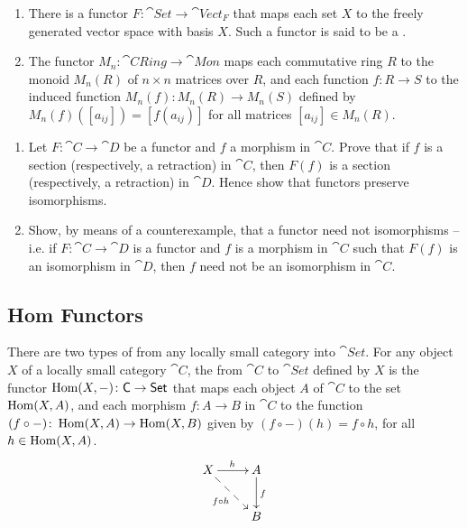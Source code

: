 \begin{Example}
\begin{enumerate}
\item There is a functor $F \colon \cat{Set} \to \cat{Vect}_F$ that maps each set $X$ to the freely generated vector space with basis $X$. Such a functor is said to be a .

\item The functor $M_n \colon \cat{CRing} \to \cat{Mon}$ maps each commutative ring $R$ to the monoid $M_n(R)$ of $n \times n$ matrices over $R$, and each function $f \colon R \to S$ to the induced function $M_n(f) \colon M_n(R) \to M_n(S)$ defined by $M_n(f)([a_{ij}]) = [f(a_{ij})]$ for all matrices $[a_{ij}] \in M_n(R)$.
\end{enumerate}
\end{Example}

\begin{Exercise}
\begin{enumerate}
\item Let $F \colon \cat C \to \cat D$ be a functor and $f$ a morphism in $\cat C$. Prove that if $f$ is a section (respectively, a retraction) in $\cat C$, then $F(f)$ is a section (respectively, a retraction) in $\cat D$. Hence show that functors preserve isomorphisms.
\item Show, by means of a counterexample, that a functor need not  isomorphisms -- i.e. if $F \colon \cat C \to \cat D$ is a functor and $f$ is a morphism in $\cat C$ such that $F(f)$ is an isomorphism in $\cat D$, then $f$ need not be an isomorphism in $\cat C$.
\end{enumerate}
\end{Exercise}

\subsection{Hom Functors}

There are two types of  from any locally small category into $\cat{Set}$. For any object $X$ of a locally small category $\cat C$, the  from $\cat C$ to $\cat{Set}$ defined by $X$ is the functor $\operatorname{Hom}(X, -) \colon \mathsf{C} \to \mathsf{Set}$ that maps each object $A$ of $\cat C$ to the set $\operatorname{Hom}(X, A)$, and each morphism $f \colon A \to B$ in $\cat C$ to the function $(f \circ -) \colon \operatorname{Hom}(X, A) \to \operatorname{Hom}(X, B)$ given by $(f \circ -)(h) = f \circ h$, for all $h \in \operatorname{Hom}(X, A)$.
\begin{equation*}
\xymatrix{
X \ar[r]^h \ar@{-->}[rd]_{f \circ h} & A \ar[d]^f \\
 & B
}
\end{equation*}

